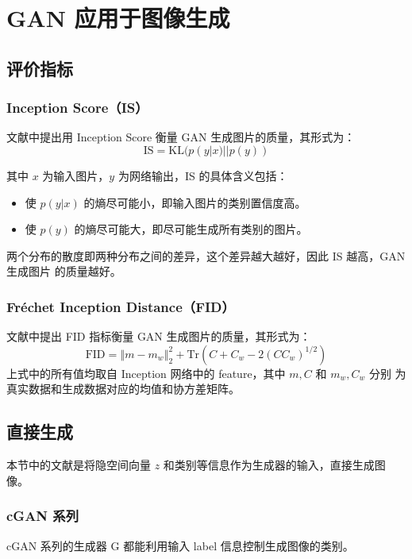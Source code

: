 \chapter{GAN 应用于图像生成}

\section{评价指标}

\subsection{Inception Score（IS）}
文献中提出用 Inception Score 衡量 GAN 生成图片的质量，其形式为：
\begin{equation}
  \label{equ:IS-score}
  \mathrm{IS} = \mathrm{KL}(p(y|x) || p(y))
\end{equation}

其中 $x$ 为输入图片，$y$ 为网络输出，IS 的具体含义包括：

\begin{itemize}
  \item 使 $p(y|x)$ 的熵尽可能小，即输入图片的类别置信度高。
  \item 使 $p(y)$ 的熵尽可能大，即尽可能生成所有类别的图片。
\end{itemize}

两个分布的散度即两种分布之间的差异，这个差异越大越好，因此 IS 越高，GAN 生成图片
的质量越好。

\subsection{Fréchet Inception Distance（FID）}
文献中提出 FID 指标衡量 GAN 生成图片的质量，其形式为：
\begin{equation}
  \label{equ:FID}
  \mathrm{FID} = \left\Vert m-m_w \right\Vert _{2}^2 + \mathrm{Tr} \left( C + C_w - 2 {\left( C C_w \right)}^{1/2} \right)
\end{equation}
上式中的所有值均取自 Inception 网络中的 feature，其中 $m, C$ 和 $m_w, C_w$ 分别
为真实数据和生成数据对应的均值和协方差矩阵。

\section{直接生成}
本节中的文献是将隐空间向量 $z$ 和类别等信息作为生成器的输入，直接生成图像。

\subsection{cGAN 系列}
cGAN 系列的生成器 G 都能利用输入 label 信息控制生成图像的类别。


